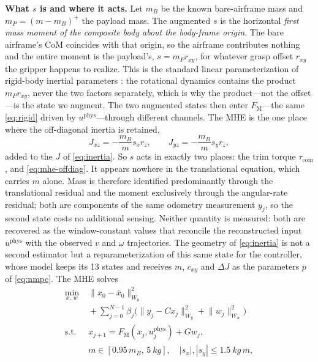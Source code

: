 \documentclass[conference]{IEEEtran}
\begin{document}
\textbf{What $s$ is and where it acts.} Let $m_B$ be the known bare-airframe mass and
$m_P=(m-m_B)^{+}$ the payload mass. The augmented $s$ is the horizontal \emph{first mass
moment of the composite body about the body-frame origin}. The bare airframe's CoM coincides
with that origin, so the airframe contributes nothing and the entire moment is the payload's,
$s=m_P r_{xy}$, for whatever grasp offset $r_{xy}$ the gripper happens to realize. This is the
standard linear parameterization of rigid-body inertial parameters \cite{atkeson1986}: the
rotational dynamics contains the product $m_P r_{xy}$, never the two factors separately, which
is why the product---not the offset---is the state we augment. The two augmented states then
enter $F_{\mathrm M}$---the same \eqref{eq:rigid} driven by $u^{\mathrm{phys}}$---through
different channels. The MHE is the one place where the off-diagonal inertia is retained,
\begin{equation}
J_{xz}=-\frac{m_B}{m}s_x r_z,\qquad J_{yz}=-\frac{m_B}{m}s_y r_z,
\label{eq:mhe-offdiag}
\end{equation}
added to the $J$ of \eqref{eq:inertia}. So $s$ acts in exactly two places: the trim torque
$\tau_{\mathrm{com}}$, and \eqref{eq:mhe-offdiag}. It appears nowhere in the translational
equation, which carries $m$ alone. Mass is therefore identified predominantly through the translational
residual and the moment exclusively through the angular-rate residual; both are components of
the same odometry measurement $y_j$, so the second state costs no additional sensing. Neither
quantity is measured: both are recovered as the window-constant values that reconcile the
reconstructed input $u^{\mathrm{phys}}$ with the observed $v$ and $\omega$ trajectories.
The geometry of \eqref{eq:inertia} is not a second estimator but a
reparameterization of this same state for the controller, whose model keeps its 13 states and
receives $m$, $c_{xy}$ and $\Delta J$ as the parameters $p$ of \eqref{eq:nmpc}. The MHE
solves
\begin{equation}
\begin{aligned}
\min_{x,\,w}\;& \lVert x_0-\bar x_0\rVert_{W_0}^2\\
& {}+\textstyle\sum_{j=0}^{N-1}\beta_j\bigl(\lVert y_j-Cx_j\rVert_{W_y}^2
  +\lVert w_j\rVert_{W_w}^2\bigr)\\
\text{s.t.}\;& x_{j+1}=F_{\mathrm M}(x_j,u^{\mathrm{phys}}_j)+Gw_j,\\
& m\in[0.95\,m_B,\,\SI{5}{kg}],\quad |s_x|,|s_y|\le\SI{1.5}{kg\,m},
\end{aligned}
\label{eq:mhe}
\end{equation}
\end{document}
